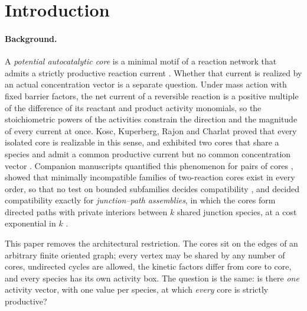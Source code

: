 \documentclass[11pt,a4paper]{article}
\theoremstyle{plain}
\theoremstyle{definition}
\theoremstyle{remark}
\begin{document}
\begin{abstract}
\end{abstract}

\section{Introduction}\label{sec:intro}

\paragraph{Background.} A \emph{potential autocatalytic core} is a minimal motif of a reaction network that admits a strictly productive reaction current \citep{blokhuis2020,kosc2025}. Whether that current is realized by an actual concentration vector is a separate question. Under mass action with fixed barrier factors, the net current of a reversible reaction is a positive multiple of the difference of its reactant and product activity monomials, so the stoichiometric powers of the activities constrain the direction and the magnitude of every current at once. Kosc, Kuperberg, Rajon and Charlat proved that every isolated core is realizable in this sense, and exhibited two cores that share a species and admit a common productive current but no common concentration vector \citep{kosc2025}. Companion manuscripts quantified this phenomenon for pairs of cores \citep{tcic2026}, showed that minimally incompatible families of two-reaction cores exist in every order, so that no test on bounded subfamilies decides compatibility \citep{tcch2026}, and decided compatibility exactly for \emph{junction--path assemblies}, in which the cores form directed paths with private interiors between $k$ shared junction species, at a cost exponential in $k$ \citep{jp2026}.

This paper removes the architectural restriction. The cores sit on the edges of an arbitrary finite oriented graph; every vertex may be shared by any number of cores, undirected cycles are allowed, the kinetic factors differ from core to core, and every species has its own activity box. The question is the same: is there \emph{one} activity vector, with one value per species, at which \emph{every} core is strictly productive?
\end{document}

